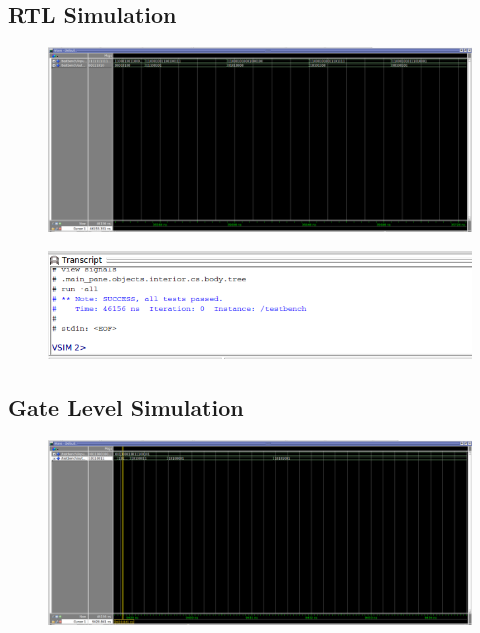 \documentclass[12pt]{article}
\begin{document}
    \newpage 
    \subsection{RTL Simulation}
    \noindent
    \begin{figure}[H]
        \centering
        \includegraphics[width=0.8\linewidth]{rtl_simproper.png}
    \end{figure}
    
    \begin{figure}[H]
        \centering
        \includegraphics[width=0.8\linewidth]{rtl_simproper (copy).png}
    \end{figure}
    \subsection{Gate Level Simulation}
    \noindent
    \begin{figure}[H]
        \centering
        \includegraphics[width=0.8\linewidth]{gateLevel.png}
    \end{figure}
    
\end{document}
